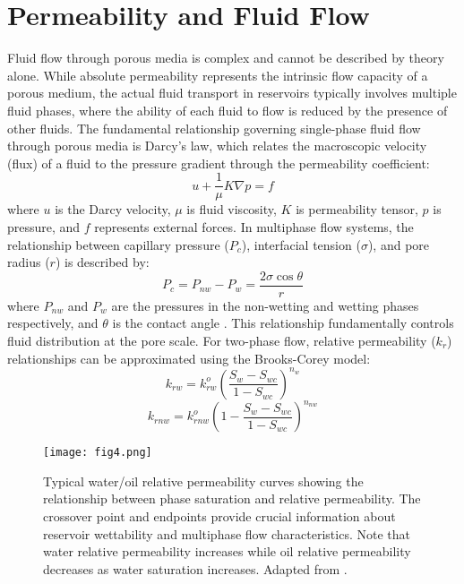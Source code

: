 \documentclass[journal]{IEEEtran}
\begin{document}
\section{Permeability and Fluid Flow}
Fluid flow through porous media is complex and cannot be described by theory alone. While absolute permeability represents the intrinsic flow capacity of a porous medium, the actual fluid transport in reservoirs typically involves multiple fluid phases, where the ability of each fluid to flow is reduced by the presence of other fluids.
The fundamental relationship governing single-phase fluid flow through porous media is Darcy's law, which relates the macroscopic velocity (flux) of a fluid to the pressure gradient through the permeability coefficient:
\begin{equation}
u + \frac{1}{\mu} K\nabla p = f
\end{equation}
where $u$ is the Darcy velocity, $\mu$ is fluid viscosity, $K$ is permeability tensor, $p$ is pressure, and $f$ represents external forces.
In multiphase flow systems, the relationship between capillary pressure ($P_c$), interfacial tension ($\sigma$), and pore radius ($r$) is described by:
\begin{equation}
P_c = P_{nw} - P_w = \frac{2\sigma\cos\theta}{r}
\end{equation}
where $P_{nw}$ and $P_w$ are the pressures in the non-wetting and wetting phases respectively, and $\theta$ is the contact angle \parencite{honarpour_relative-permeability_1988}. This relationship fundamentally controls fluid distribution at the pore scale.
For two-phase flow, relative permeability ($k_r$) relationships can be approximated using the Brooks-Corey model:
\begin{equation}
k_{rw} = k_{rw}^o(\frac{S_w - S_{wc}}{1 - S_{wc}})^{n_w}
\end{equation}
\begin{equation}
k_{rnw} = k_{rnw}^o(1 - \frac{S_w - S_{wc}}{1 - S_{wc}})^{n_{nw}}
\end{equation}

\begin{figure}[t]
    \centering
    \texttt{[image: fig4.png]}
    \caption{Typical water/oil relative permeability curves showing the relationship between phase saturation and relative permeability. The crossover point and endpoints provide crucial information about reservoir wettability and multiphase flow characteristics. Note that water relative permeability increases while oil relative permeability decreases as water saturation increases. Adapted from \textcite{honarpour_relative-permeability_1988}.}
    \label{fig:rel_perm}
\end{figure}
\end{document}
